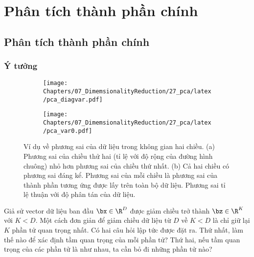 \chapter{Phân tích thành phần chính}
\label{cha:pca}
   
\section{Phân tích thành phần chính}
\subsection{Ý tưởng} %


 \begin{figure}[t]
     \begin{subfigure}{0.59\textwidth}
     \texttt{[image: Chapters/07\_DimemsionalityReduction/27\_pca/latex/pca\_diagvar.pdf]}
     \caption{}
     \label{fig:pca_2a}
     \end{subfigure}
     \begin{subfigure}{0.33\textwidth}
     \texttt{[image: Chapters/07\_DimemsionalityReduction/27\_pca/latex/pca\_var0.pdf]}
     \caption{}
     \label{fig:pca_2b}
     \end{subfigure}
     \caption{Ví dụ về phương sai của dữ liệu trong không gian hai chiều. (a)
     Phương sai của chiều thử hai (tỉ lệ với độ rộng của đường hình chuông) nhỏ
     hơn phương sai của chiều thứ nhất. (b) Cả hai chiều có phương sai đáng kể. Phương sai của
     mỗi chiều là phương sai của thành phần tương ứng được lấy trên toàn bộ dữ
     liệu. Phương sai tỉ lệ thuận với độ phân tán của dữ liệu.}
     \label{fig:pca_2}
 \end{figure}

Giả sử vector dữ liệu ban đầu $\bx \in \R^{D}$ được giảm chiều trở thành $\bz
\in \R^K$ với $K < D$. Một cách đơn giản để giảm chiều dữ liệu từ $D$ về $K < D$ là chỉ giữ lại $K$ phần tử {quan trọng nhất}. Có hai câu hỏi lập tức
được đặt ra. Thứ nhất, làm thế nào để xác định {tầm quan trọng} của
mỗi phần tử? Thứ hai, nếu tầm quan trọng của các phần tử là như
nhau, ta cần bỏ đi những phần tử nào?

